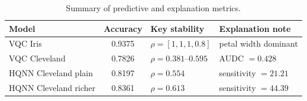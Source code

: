 \begin{table}[!t]
\centering
\caption{Summary of predictive and explanation metrics.}
\label{tab:results-summary}
\scriptsize
\setlength{\tabcolsep}{5pt}
\begin{tabular}{@{}lcp{3.0cm}p{6.0cm}@{}}
\toprule
Model & Accuracy & Key stability & Explanation note \\
\midrule
VQC Iris & 0.9375 & $\rho=[1,1,1,0.8]$ & petal width dominant \\
VQC Cleveland & 0.7826 & $\rho=0.381$--$0.595$ & AUDC $=0.428$ \\
HQNN Cleveland plain & 0.8197 & $\rho=0.554$ & sensitivity $=21.21$ \\
HQNN Cleveland richer & 0.8361 & $\rho=0.613$ & sensitivity $=44.39$ \\
\bottomrule
\end{tabular}
\end{table}
